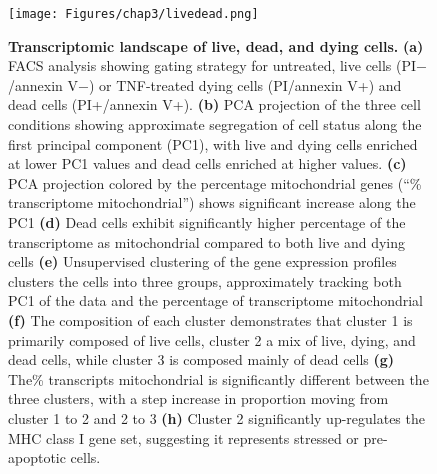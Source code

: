 \begin{figure}
	\centering
	\texttt{[image: Figures/chap3/livedead.png]}
	\caption[Transcriptomic landscape of live, dead, and dying cells.]
	{\small
	    \textbf{Transcriptomic landscape of live, dead, and dying cells.}
	    \textbf{(a)} FACS analysis showing gating strategy for untreated, live cells (PI$-$/annexin V$-$) or TNF\textalpha-treated dying cells (PI/annexin V+) and dead cells (PI+/annexin V+).
	    \textbf{(b)} PCA projection of the three cell conditions showing approximate segregation of cell status along the first principal component (PC1), with live and dying cells enriched at lower PC1 values and dead cells enriched at higher values.
	    \textbf{(c)} PCA projection colored by the percentage mitochondrial genes (``\% transcriptome mitochondrial'') shows significant increase along the PC1 \textbf{(d)} Dead cells exhibit significantly higher percentage of the transcriptome as mitochondrial compared to both live and dying cells \textbf{(e)} Unsupervised clustering of the gene expression profiles clusters the cells into three groups, approximately tracking both PC1 of the data and the percentage of transcriptome mitochondrial \textbf{(f)} The composition of each cluster demonstrates that cluster 1 is primarily composed of live cells, cluster 2 a mix of live, dying, and dead cells, while cluster 3 is composed mainly of dead cells \textbf{(g)} The\% transcripts mitochondrial is significantly different between the three clusters, with a step increase in proportion moving from cluster 1 to 2 and 2 to 3 \textbf{(h)} Cluster 2 significantly up-regulates the MHC class I gene set, suggesting it represents stressed or pre-apoptotic cells.
	}
	\label{fig:livedead}
\end{figure}


